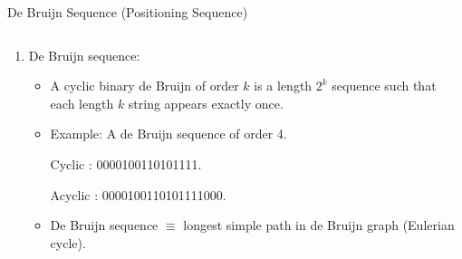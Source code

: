 \begin{frame}{De Bruijn Sequence (Positioning Sequence)}
    \begin{columns}
        \begin{column}{0.65\textwidth}
            \begin{enumerate}
                \vfill\item De Bruijn sequence:
                \begin{itemize}
                    \vfill\item A cyclic binary de Bruijn of order $k$ is a length $2^{k}$ sequence such that each length $k$ string appears exactly once.
                    \vfill\item Example: A de Bruijn sequence of order $4$.
                    
                    {\color{teal}Cyclic} : {\color{blue}0000100110101111}.

                    {\color{teal}Acyclic} : {\color{blue}0000100110101111000}.
                
                    \vfill\item De Bruijn sequence $\equiv$ longest simple path in de Bruijn graph (Eulerian cycle).
                    
                    
                \end{itemize}
            \end{enumerate}
        \end{column}
        

\end{columns}
\end{frame}
